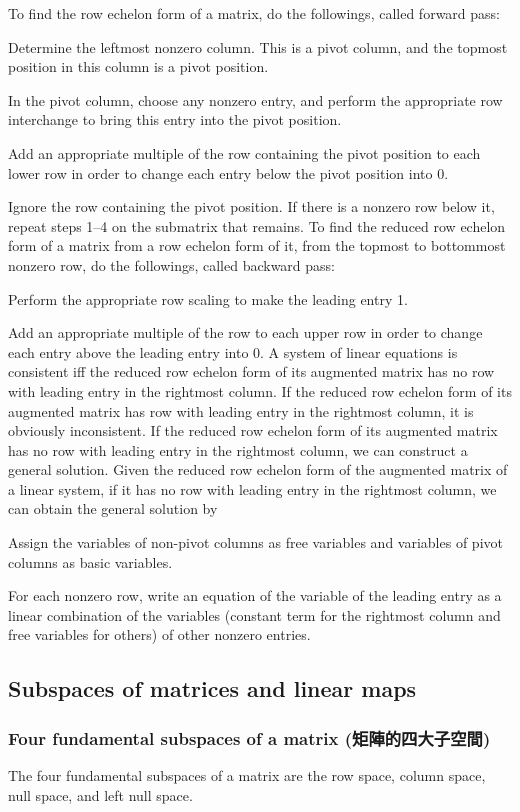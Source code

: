 \documentclass[a4paper,12pt]{report}
\begin{document}
To find the row echelon form of a matrix, do the followings, called forward pass:
\ben
\item Determine the leftmost nonzero column. This is a pivot column, and the topmost position in this column is a pivot position.
\item In the pivot column, choose any nonzero entry, and perform the appropriate row interchange to bring this entry into the pivot position.
\item Add an appropriate multiple of the row containing the pivot position to each lower row in order to change each entry below the pivot position into 0.
\item Ignore the row containing the pivot position. If there is a nonzero row below it, repeat steps 1–4 on the submatrix that remains.
\een
To find the reduced row echelon form of a matrix from a row echelon form of it, from the topmost to bottommost nonzero row, do the followings, called backward pass:
\ben
\item Perform the appropriate row scaling to make the leading entry 1.
\item Add an appropriate multiple of the row to each upper row in order to change each entry above the leading entry into 0.
\een
A system of linear equations is consistent iff the reduced row echelon form of its augmented matrix has no row with leading entry in the rightmost column.
\bpr
If the reduced row echelon form of its augmented matrix has row with leading entry in the rightmost column, it is obviously inconsistent. If the reduced row echelon form of its augmented matrix has no row with leading entry in the rightmost column, we can construct a general solution.
\epr
Given the reduced row echelon form of the augmented matrix of a linear system, if it has no row with leading entry in the rightmost column, we can obtain the general solution by
\ben
\item Assign the variables of non-pivot columns as free variables and variables of pivot columns as basic variables.
\item For each nonzero row, write an equation of the variable of the leading entry as a linear combination of the variables (constant term for the rightmost column and free variables for others) of other nonzero entries.
\een
\subsection{Subspaces of matrices and linear maps}
\subsubsection{Four fundamental subspaces of a matrix (矩陣的四大子空間)}
The four fundamental subspaces of a matrix are the row space, column space, null space, and left null space.
\end{document}
